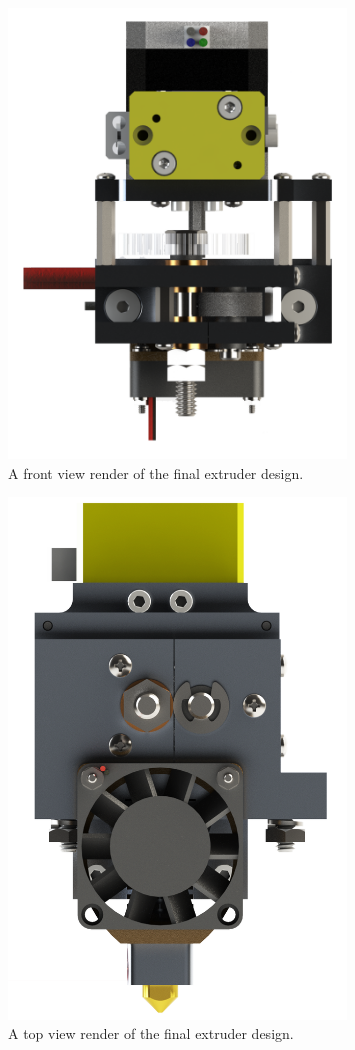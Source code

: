 \begin{figure}[htp]
\centering
\includegraphics[width=0.8\textwidth]{./figures/extruder-top}
\caption{A front view render of the final extruder design.}
\label{fig:flowchart}
\end{figure}

\begin{figure}[htp]
\centering
\includegraphics[width=0.8\textwidth]{./figures/extruder-front}
\caption{A top view render of the final extruder design.}
\label{fig:flowchart}
\end{figure}

